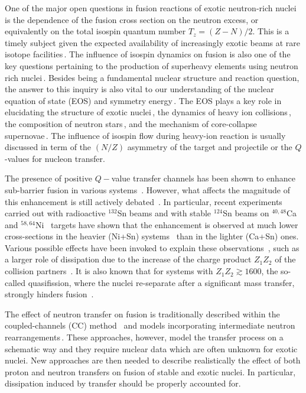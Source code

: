 One of the major open questions in fusion reactions of exotic neutron-rich nuclei
is the dependence of the fusion cross section on the neutron excess,
or equivalently on the total isospin quantum number $T_z = (Z-N)/2$.
This is a timely subject given the expected
availability of increasingly exotic beams at rare isotope facilities\,\citep{balantekin2014}.
The influence of isospin dynamics on fusion is also one of the key questions pertaining to the
production of superheavy elements using neutron rich nuclei\,\citep{loveland2007}.
Besides being a fundamental nuclear structure and reaction question, the answer to this inquiry
is also vital to our understanding of the nuclear equation of state (EOS) and symmetry energy\,\citep{li2014}.
The EOS plays a key role in elucidating the structure of exotic nuclei\,\citep{chen2015},
the dynamics of heavy ion collisions\,\citep{danielewicz2002,tsang2009},
the composition of neutron stars\,\citep{haensel1990,chamel2008,horowitz2004,utama2016}, and the mechanism of core-collapse supernovae\,\citep{bonche1981,watanabe2009,shen2011}.
The influence of isospin flow during heavy-ion reaction is usually discussed in term of the
$(N/Z)$ asymmetry of the target and projectile or the $Q$-values for nucleon transfer.

The presence of positive $Q-$value transfer channels has been shown to enhance sub-barrier fusion in various systems~\citep{jiang2014a}.
However, what affects the magnitude of this enhancement is still actively debated~\citep{kohley2011,kohley2013,kolata2012,jiang2015,liang2016}.
In particular, recent experiments carried out
with radioactive $^{132}$Sn beams and with stable $^{124}$Sn beams on
$^{40,48}$Ca~\citep{kolata2012} and $^{58,64}$Ni~\citep{kohley2011} targets have shown that the enhancement is observed at much lower cross-sections in the heavier (Ni+Sn) systems~\citep{jiang2015} than in the lighter (Ca+Sn) ones.
Various possible effects have been invoked to explain these observations~\citep{liang2016},
such as a larger role of dissipation due to the increase of the charge product $Z_1Z_2$ of the collision partners~\citep{wolfs1987,evers2011,rafferty2016}.
It is also known that for systems with $Z_1Z_2\gtrsim1600$, the so-called quasifission, where the nuclei re-separate after a significant mass transfer, strongly hinders fusion~\citep{toke1985}.

The effect of neutron transfer on fusion is traditionally described  within the coupled-channels (CC) method~\citep{rowley1992,esbensen1998,hagino2012}
and models incorporating intermediate neutron
rearrangements\,\citep{zagrebaev2003,zagrebaev2007c,karpov2015}.
These approaches, however, model the transfer process on a schematic way
and they require nuclear data which are often unknown for exotic nuclei.
New approaches are then needed to describe realistically the effect of both proton and neutron transfers on fusion of stable and exotic nuclei.
In particular, dissipation induced by transfer should be properly accounted for.

